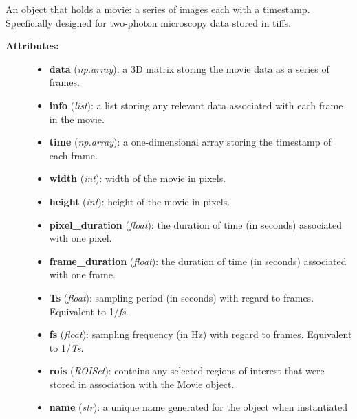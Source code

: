 \documentclass[letterpaper,10pt,english]{sphinxmanual}
\begin{document}
\begin{fulllineitems}
\label{data_structures:movies.Movie}
An object that holds a movie: a series of images each with a timestamp. Specficially designed for two-photon microscopy data stored in tiffs.
\begin{description}
\item[{\textbf{Attributes:}}] \leavevmode\begin{itemize}
\item {} 
\textbf{data} (\emph{np.array}): a 3D matrix storing the movie data as a series of frames.

\item {} 
\textbf{info} (\emph{list}): a list storing any relevant data associated with each frame in the movie.

\item {} 
\textbf{time} (\emph{np.array}): a one-dimensional array storing the timestamp of each frame.

\item {} 
\textbf{width} (\emph{int}): width of the movie in pixels.

\item {} 
\textbf{height} (\emph{int}): height of the movie in pixels.

\item {} 
\textbf{pixel\_duration} (\emph{float}): the duration of time (in seconds) associated with one pixel.

\item {} 
\textbf{frame\_duration} (\emph{float}): the duration of time (in seconds) associated with one frame.

\item {} 
\textbf{Ts} (\emph{float}): sampling period (in seconds) with regard to frames. Equivalent to 1/\emph{fs}.

\item {} 
\textbf{fs} (\emph{float}): sampling frequency (in Hz) with regard to frames. Equivalent to 1/\emph{Ts}.

\item {} 
\textbf{rois} (\emph{ROISet}): contains any selected regions of interest that were stored in association with the Movie object.

\item {} 
\textbf{name} (\emph{str}): a unique name generated for the object when instantiated


\end{itemize}
\end{description}
\end{fulllineitems}
\end{document}
